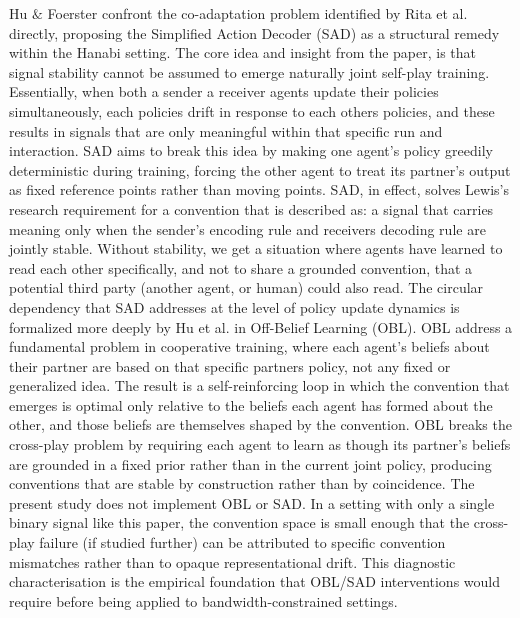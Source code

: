 \documentclass[a4paper,twoside,12pt]{report}
\begin{document}
    Hu $\&$ Foerster \citeyearpar{hu2020decoder} confront the co-adaptation problem identified by Rita et al. directly, proposing the Simplified Action Decoder (SAD) as a structural remedy within the Hanabi setting. The core idea and insight from the paper, is that signal stability cannot be assumed to emerge naturally joint self-play training. Essentially, when both a sender a receiver agents update their policies simultaneously, each policies drift in response to each others policies, and these results in signals that are only meaningful within that specific run and interaction. SAD aims to break this idea by making one agent's policy greedily deterministic during training, forcing the other agent to treat its partner's output as fixed reference points rather than moving points. SAD, in effect, solves Lewis's research requirement for a convention that is described as: a signal that carries meaning only when the sender's encoding rule and receivers decoding rule are jointly stable. Without stability, we get a situation where agents have learned to read each other specifically, and not to share a grounded convention, that a potential third party (another agent, or human) could also read. 
    \newline
    \newline
    The circular dependency that SAD addresses at the level of policy update dynamics is formalized more deeply by Hu et al. \citeyearpar{hu2021obl} in Off-Belief Learning (OBL). OBL address a fundamental problem in cooperative training, where each agent's beliefs about their partner are based on that specific partners policy, not any fixed or generalized idea. The result is a self-reinforcing loop in which the convention that emerges is optimal only relative to the beliefs each agent has formed about the other, and those beliefs are themselves shaped by the convention. OBL breaks the cross-play problem by requiring each agent to learn as though its partner's beliefs are grounded in a fixed prior rather than in the current joint policy, producing conventions that are stable by construction rather than by coincidence. The present study does not implement OBL or SAD. In a setting with only a single binary signal like this paper, the convention space is small enough that the cross-play failure (if studied further) can be attributed to specific convention mismatches rather than to opaque representational drift. This diagnostic characterisation is the empirical foundation that OBL/SAD interventions would require before being applied to bandwidth-constrained settings.
    \newline
    \newline
\end{document}
